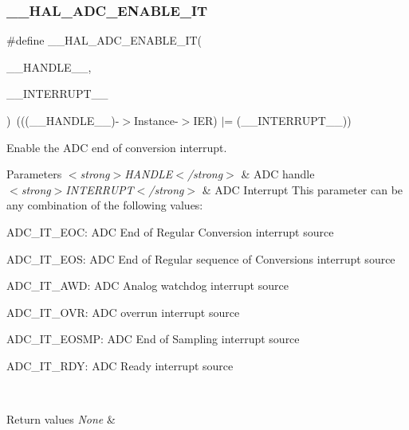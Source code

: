 \subsubsection{\texorpdfstring{\+\_\+\+\_\+\+H\+A\+L\+\_\+\+A\+D\+C\+\_\+\+E\+N\+A\+B\+L\+E\+\_\+\+IT}{\_\_HAL\_ADC\_ENABLE\_IT}}
{\footnotesize\ttfamily \#define \+\_\+\+\_\+\+H\+A\+L\+\_\+\+A\+D\+C\+\_\+\+E\+N\+A\+B\+L\+E\+\_\+\+IT(\begin{DoxyParamCaption}\item[{}]{\+\_\+\+\_\+\+H\+A\+N\+D\+L\+E\+\_\+\+\_\+,  }\item[{}]{\+\_\+\+\_\+\+I\+N\+T\+E\+R\+R\+U\+P\+T\+\_\+\+\_\+ }\end{DoxyParamCaption})~(((\+\_\+\+\_\+\+H\+A\+N\+D\+L\+E\+\_\+\+\_\+)-\/$>$Instance-\/$>$I\+ER) $\vert$= (\+\_\+\+\_\+\+I\+N\+T\+E\+R\+R\+U\+P\+T\+\_\+\+\_\+))}



Enable the A\+DC end of conversion interrupt. 


\begin{DoxyParams}{Parameters}
{\em $<$strong$>$\+H\+A\+N\+D\+L\+E$<$/strong$>$} & A\+DC handle \\
\hline
{\em $<$strong$>$\+I\+N\+T\+E\+R\+R\+U\+P\+T$<$/strong$>$} & A\+DC Interrupt This parameter can be any combination of the following values\+: \begin{DoxyItemize}
\item A\+D\+C\+\_\+\+I\+T\+\_\+\+E\+OC\+: A\+DC End of Regular Conversion interrupt source \item A\+D\+C\+\_\+\+I\+T\+\_\+\+E\+OS\+: A\+DC End of Regular sequence of Conversions interrupt source \item A\+D\+C\+\_\+\+I\+T\+\_\+\+A\+WD\+: A\+DC Analog watchdog interrupt source \item A\+D\+C\+\_\+\+I\+T\+\_\+\+O\+VR\+: A\+DC overrun interrupt source \item A\+D\+C\+\_\+\+I\+T\+\_\+\+E\+O\+S\+MP\+: A\+DC End of Sampling interrupt source \item A\+D\+C\+\_\+\+I\+T\+\_\+\+R\+DY\+: A\+DC Ready interrupt source \end{DoxyItemize}
\\
\hline
\end{DoxyParams}

\begin{DoxyRetVals}{Return values}
{\em None} & \\
\hline
\end{DoxyRetVals}
\mbox{\label{group___a_d_c___exported___macros_gaff951862689bb92173f803577cf2d447}} 
